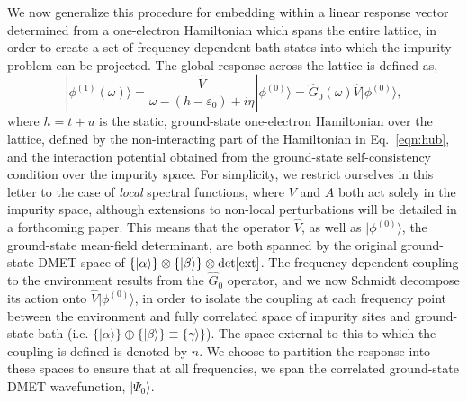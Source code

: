 \documentclass[aps,showpacs,twocolumn,nobibnotes]{revtex4}
\begin{document}
We now generalize this procedure for embedding within a linear response vector determined from a one-electron Hamiltonian which spans the entire lattice, in order to create a 
set of frequency-dependent bath states into which the impurity problem can be projected. 
The global response across the lattice is defined as,
\begin{equation}
    |\phi^{(1)}(\omega) \rangle = \frac{{\hat V} }{\omega-(h-\varepsilon_0)+i\eta}|\phi^{(0)}\rangle = {\hat G_0}(\omega) {\hat V} |\phi^{(0)} \rangle  , \label{nonintGF}
\end{equation}
where $h = t + u$ is the static, ground-state one-electron Hamiltonian over the lattice, defined by the non-interacting part of the Hamiltonian in Eq.~\ref{eqn:hub}, and the interaction
potential obtained from the ground-state self-consistency condition over the impurity space. 
For simplicity, we restrict ourselves in this letter to the case of {\em local} spectral functions, where $V$ and $A$ both act solely in the impurity space, although extensions to non-local
perturbations will be detailed in a forthcoming paper. This means that the operator ${\hat V}$, as well as $|\phi^{(0)} \rangle$, the ground-state mean-field determinant, are both spanned by
the original ground-state DMET space of $\{ |\alpha \rangle \} \otimes \{ |\beta \rangle \} \otimes \rm{det[ext]}$. The frequency-dependent coupling to the environment results from the
${\hat G_0}$ operator, and we now Schmidt decompose its action onto ${\hat V} |\phi^{(0)} \rangle$, in order to isolate the coupling at each frequency point between the 
environment and fully correlated space of impurity sites and ground-state bath (i.e. $\{|\alpha \rangle \} \oplus \{|\beta \rangle \} \equiv \{ \gamma \rangle \}$). The space external to this to which
the coupling is defined is denoted by $n$. We choose to partition the response into these spaces to ensure that at all frequencies, we span the correlated ground-state DMET wavefunction, $|\Psi_0 \rangle$.
\end{document}
